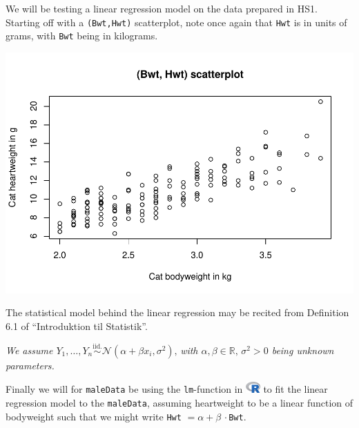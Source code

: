 \documentclass[
]{article}
\newenvironment{Shaded}{\begin{snugshade}}{\end{snugshade}}
\newcommand{\DataTypeTok}[1]{\textcolor[rgb]{0.13,0.29,0.53}{#1}}
\newcommand{\KeywordTok}[1]{\textcolor[rgb]{0.13,0.29,0.53}{\textbf{#1}}}
\newcommand{\NormalTok}[1]{#1}
\newcommand{\OperatorTok}[1]{\textcolor[rgb]{0.81,0.36,0.00}{\textbf{#1}}}
\newcommand{\StringTok}[1]{\textcolor[rgb]{0.31,0.60,0.02}{#1}}
\begin{document}
We will be testing a linear regression model on the data prepared in
HS1. Starting off with a \texttt{(Bwt,Hwt)} scatterplot, note once again
that \texttt{Hwt} is in units of grams, with \texttt{Bwt} being in
kilograms.

\begin{Shaded}
\end{Shaded}

\begin{center}\includegraphics{matstatproblems20-21_files/figure-latex/unnamed-chunk-5-1} \end{center}

The statistical model behind the linear regression may be recited from
Definition 6.1 of ``Introduktion til Statistik''.

\emph{We assume
\(Y_1,\ldots,Y_n \overset{\text{iid.}}{\sim}\mathcal{N}(\alpha+\beta x_i,\sigma^2),\,\)with
\(\alpha,\beta\in\mathbb{R},\,\sigma^2>0\) being unknown parameters.}

Finally we will for \texttt{maleData} be using the \texttt{lm}-function
in \includegraphics[width=\textwidth,height=0.16667in]{R_logo.png} to
fit the linear regression model to the \texttt{maleData}, assuming
heartweight to be a linear function of bodyweight such that we might
write \texttt{Hwt} \(= \alpha + \beta\,\cdot\)\texttt{Bwt}.
\end{document}
